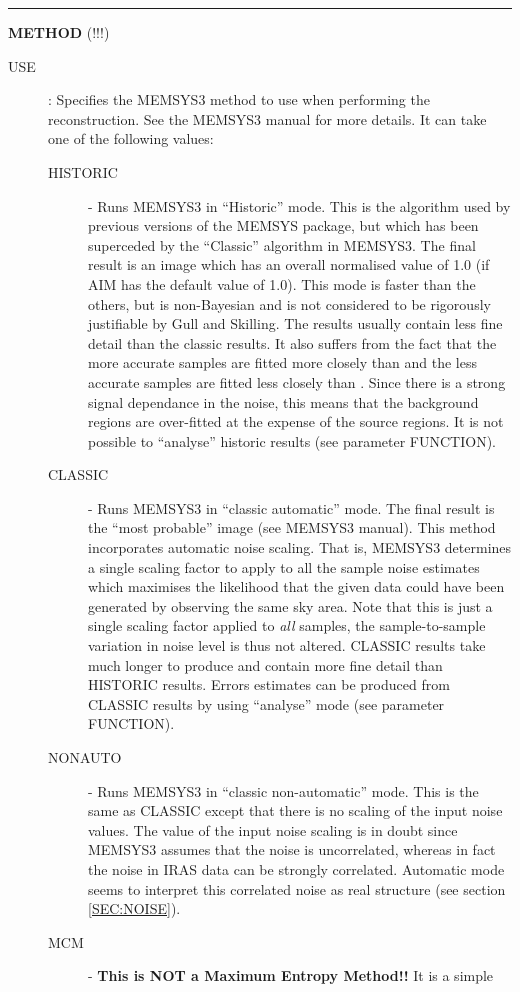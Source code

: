 \rule{\textwidth}{0.3mm}
{\Large {\bf METHOD} (!!!)}
\begin{description}
\item [USE]:
Specifies the MEMSYS3 method to use when performing the reconstruction. See the 
MEMSYS3 manual for more details. It can take one of the following values:
\begin {description}
\item [HISTORIC] - Runs MEMSYS3 in ``Historic'' mode. This is the algorithm used 
by previous versions of the MEMSYS package, but which has been superceded by 
the ``Classic'' algorithm in MEMSYS3. The final result is 
an image which has an overall normalised \chisq value of 1.0 (if AIM has the default 
value of 1.0). This mode is faster than the others, but is non-Bayesian and
is not considered to be rigorously justifiable by Gull and Skilling.
The results usually contain less fine detail than the classic results. It also 
suffers from the fact that the more accurate samples are fitted more closely 
than  and the less accurate samples are fitted less closely than 
. Since there is a strong signal dependance in the 
noise, this means that the background regions are over-fitted at the expense of 
the source regions. It is not possible to ``analyse'' historic results (see 
parameter FUNCTION).
\item [CLASSIC] - Runs MEMSYS3 in ``classic automatic'' mode. The final result 
is the ``most probable'' image (see MEMSYS3 manual). This method incorporates 
automatic noise scaling. That is, MEMSYS3 determines a single scaling factor to
apply to all the sample noise estimates which maximises the likelihood that the
given data could have been generated by observing the same sky area. Note that
this is just a single scaling factor applied to {\em all} samples, the 
sample-to-sample variation in noise level is thus not altered. CLASSIC results
take much longer to produce and contain more fine detail than HISTORIC results. 
Errors estimates can be produced from CLASSIC results by using  ``analyse''
mode (see parameter FUNCTION).
\item [NONAUTO] - Runs MEMSYS3 in ``classic non-automatic'' mode. This is the 
same as CLASSIC except that there is no scaling of the input noise values. The
value of the input noise scaling is in doubt since MEMSYS3 assumes that the 
noise is uncorrelated, whereas in fact the noise in IRAS data can be strongly 
correlated. Automatic mode seems to interpret this correlated noise as real 
structure (see section \ref {SEC:NOISE}).
\item [MCM] - {\bf This is NOT a Maximum Entropy Method!!} It is a simple 

\end{description}
\end{description}
